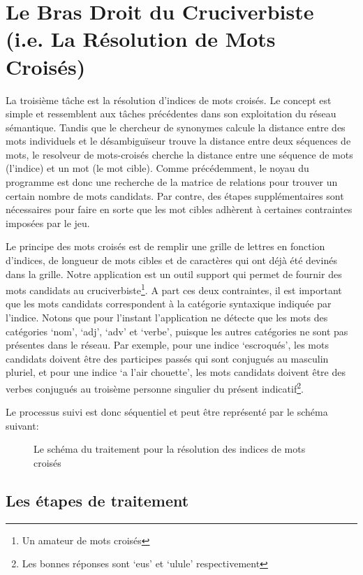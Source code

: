 \section{Le Bras Droit du Cruciverbiste (i.e. La Résolution de Mots Croisés)}

La troisième tâche est la résolution d'indices de mots croisés. Le concept est simple et ressemblent aux tâches précédentes dans son exploitation du réseau sémantique. Tandis que le chercheur de synonymes calcule la distance entre des mots individuels et le désambiguïseur trouve la distance entre deux séquences de mots, le resolveur de mots-croisés cherche la distance entre une séquence de mots (l'indice) et un mot (le mot cible). Comme précédemment, le noyau du programme est donc une recherche de la matrice de relations pour trouver un certain nombre de mots candidats. Par contre, des étapes supplémentaires sont nécessaires pour faire en sorte que les mot cibles adhèrent à certaines contraintes imposées par le jeu.

Le principe des mots croisés est de remplir une grille de lettres en fonction d'indices, de longueur de mots cibles et de caractères qui ont déjà été devinés dans la grille. Notre application est un outil support qui permet de fournir des mots candidats au cruciverbiste\footnote{Un amateur de mots croisés}. A part ces deux contraintes, il est important que les mots candidats correspondent à la catégorie syntaxique indiquée par l'indice. Notons que pour l'instant l'application ne détecte que les mots des catégories \lq{nom}\rq, \lq{adj}\rq, \lq{adv}\rq{} et \lq{verbe}\rq, puisque les autres catégories ne sont pas présentes dans le réseau. Par exemple, pour une indice \lq{escroqués}\rq, les mots candidats doivent être des participes passés qui sont conjugués au masculin pluriel, et pour une indice \lq{a l'air chouette}\rq, les mots candidats doivent être des verbes conjugués au troisème personne singulier du présent indicatif\footnote{Les bonnes réponses sont \lq{eus}\rq{}  et \lq{ulule}\rq{} respectivement}.

Le processus suivi est donc séquentiel et peut être représenté par le schéma suivant:   

\begin{figure}[!ht]
\centering
\def\svgwidth{\columnwidth}

\caption{Le schéma du traitement pour la résolution des indices de mots croisés}
\label{fig:schema_crosswords}
\end{figure}

\subsection{Les étapes de traitement}

